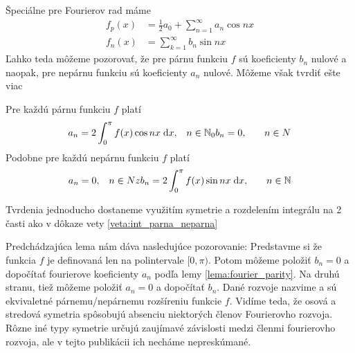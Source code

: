 Špeciálne pre Fourierov rad máme
\begin{align}
    f_p(x) &= \frac{1}{2} a_0 + \sum_{n=1}^{\infty} a_n \cos n x \\
    f_n(x) &= \sum_{k=1}^{\infty} b_n \sin n x
\end{align}
Ľahko teda môžeme pozorovať, že pre párnu funkciu $f$ sú koeficienty
$b_n$ nulové a naopak, pre nepárnu funkciu sú koeficienty $a_n$
nulové. Môžeme však tvrdiť ešte viac
\begin{lema}
    Pre každú párnu funkciu $f$ platí
    \begin{align}
        a_n = 2 \int_0^{\pi} f(x) \cos n x \; \mathrm{d} x, \quad & n \in \mathbb{N}_0
        b_n = 0, \quad& n\in N
    \end{align}
    Podobne pre každú nepárnu funkciu $f$ platí
    \begin{align}
        a_n = 0, \quad& n\in Nz
        b_n = 2 \int_0^{\pi} f(x) \sin n x \; \mathrm{d} x, \quad & n \in \mathbb{N}
    \end{align}
    \label{lema:fourier_parity}
\end{lema}
\begin{dokaz}
    Tvrdenia jednoducho dostaneme využitím symetrie a rozdelením
    integrálu na 2 časti ako v dôkaze vety \ref{veta:int_parna_neparna}
\end{dokaz}
Predchádzajúca lema nám dáva nasledujúce pozorovanie: Predstavme si že
funkcia $f$ je definovaná len na polintervale $[0,\pi)$. Potom môžeme
položiť $b_n=0$ a dopočítať fourierove koeficienty $a_n$ podľa lemy
\ref{lema:fourier_parity}. Na druhú stranu, tiež môžeme položiť
$a_n=0$ a dopočítať $b_n$. Dané rozvoje nazvime  a sú ekvivaletné párnemu/nepárnemu
rozšíreniu funkcie $f$. Vidíme teda, že osová a stredová symetria
spôsobujú absenciu niektorých členov Fourierovho rozvoja. Rôzne iné typy
symetrie určujú zaujímavé závislosti medzi členmi fourierovho rozvoja,
ale v tejto publikácii ich necháme nepreskúmané.

